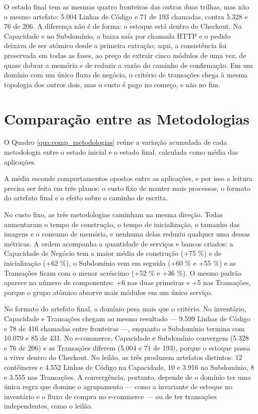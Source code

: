 

O estado final tem as mesmas quatro fronteiras das outras duas trilhas, mas não o mesmo artefato: 5.004 Linhas de Código e 71 de 193 chamadas, contra 5.328 e 76 de 206. A diferença não é de forma: o estoque está dentro do Checkout. Na Capacidade e no Subdomínio, a baixa saía por chamada HTTP e o pedido deixava de ser atômico desde a primeira extração; aqui, a consistência foi preservada em todas as fases, ao preço de extrair cinco módulos de uma vez, de quase dobrar a memória e de reduzir a vazão do caminho de confirmação. Em um domínio com um único fluxo de negócio, o critério de transações chega à mesma topologia dos outros dois, mas o custo é pago no começo, e não no fim.


\section{Comparação entre as Metodologias}
\label{sec:comparacao_metodologias}

O Quadro \ref{qua:comp_metodologias} reúne a variação acumulada de cada metodologia entre o estado inicial e o estado final, calculada como média das aplicações.



A média esconde comportamentos opostos entre as aplicações, e por isso a leitura precisa ser feita em três planos: o custo fixo de manter mais processos, o formato do artefato final e o efeito sobre o caminho de escrita.

No custo fixo, as três metodologias caminham na mesma direção. Todas aumentaram o tempo de construção, o tempo de inicialização, o tamanho das imagens e o consumo de memória, e nenhuma delas reduziu qualquer uma dessas métricas. A ordem acompanha a quantidade de serviços e bancos criados: a Capacidade de Negócio tem a maior média de construção (+75 \%) e de inicialização (+62 \%), o Subdomínio vem em seguida (+60 \% e +55 \%) e as Transações ficam com o menor acréscimo (+52 \% e +36 \%). O mesmo padrão aparece no número de componentes: +6 nas duas primeiras e +5 nas Transações, porque o grupo atômico absorve mais módulos em um único serviço.

No formato do artefato final, o domínio pesa mais que o critério. No inventário, Capacidade e Transações chegam ao mesmo resultado — 9.599 Linhas de Código e 78 de 416 chamadas entre fronteiras —, enquanto o Subdomínio termina com 10.079 e 85 de 431. No e-commerce, Capacidade e Subdomínio convergem (5.328 e 76 de 206) e as Transações diferem (5.004 e 71 de 193), porque o estoque passa a viver dentro do Checkout. No leilão, as três produzem artefatos distintos: 12 contêineres e 4.552 Linhas de Código na Capacidade, 10 e 3.916 no Subdomínio, 8 e 3.555 nas Transações. A convergência, portanto, depende de o domínio ter uma única regra que domine o agrupamento — como a invariante de estoque no inventário e o fluxo de compra no e-commerce — ou de ter transações independentes, como o leilão.

